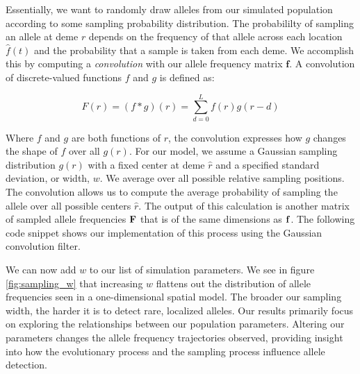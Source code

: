 Essentially, we want to randomly draw alleles from our simulated population according to some sampling probability distribution. The probabililty of sampling an allele at deme $r$ depends on the frequency of that allele across each location $\hat{f}(t)$ and the probability that a sample is taken from each deme. We accomplish this by computing a \textit{convolution} with our allele frequency matrix $\textbf{f}$. A convolution of discrete-valued functions $f$ and $g$ is defined as:

\begin{equation}\label{eq:convolution}
    F(r) = (f*g)(r) = \sum_{d=0}^L f(r)g(r-d)
\end{equation}


Where $f$ and $g$ are both functions of $r$, the convolution expresses how $g$ changes the shape of $f$ over all $g(r)$. For our model, we assume a Gaussian sampling distribution $g(r)$ with a fixed center at deme $\hat{r}$ and a specified standard deviation, or width, $w$. We average over all possible relative sampling positions. The convolution allows us to compute the average probability of sampling the allele over all possible centers $\hat{r}$. The output of this calculation is another matrix of sampled allele frequencies $\bf{F}$ that is of the same dimensions as $\bf{f}$. The following code snippet shows our implementation of this process using the  Gaussian convolution filter. 





We can now add $w$ to our list of simulation parameters. We see in figure \ref{fig:sampling_w} that increasing $w$ flattens out the distribution of allele frequencies seen in a one-dimensional spatial model. The broader our sampling width, the harder it is to detect rare, localized alleles. Our results primarily focus on exploring the relationships between our population parameters. Altering our parameters changes the allele frequency trajectories observed, providing insight into how the evolutionary process and the sampling process influence allele detection.    

